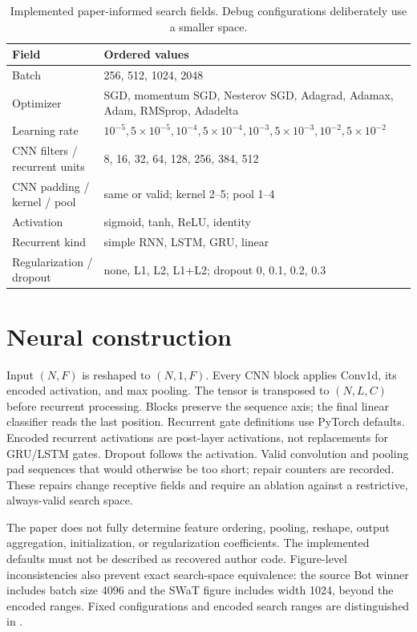 \documentclass[11pt,a4paper]{report}
\begin{document}
\begin{table}[htbp]\centering\small
\begin{tabular}{lp{10cm}}\toprule
Field & Ordered values\\\midrule
Batch & 256, 512, 1024, 2048\\
Optimizer & SGD, momentum SGD, Nesterov SGD, Adagrad, Adamax, Adam, RMSprop, Adadelta\\
Learning rate & $10^{-5},5\!\times\!10^{-5},10^{-4},5\!\times\!10^{-4},10^{-3},5\!\times\!10^{-3},10^{-2},5\!\times\!10^{-2}$\\
CNN filters / recurrent units & 8, 16, 32, 64, 128, 256, 384, 512\\
CNN padding / kernel / pool & same or valid; kernel 2--5; pool 1--4\\
Activation & sigmoid, tanh, ReLU, identity\\
Recurrent kind & simple RNN, LSTM, GRU, linear\\
Regularization / dropout & none, L1, L2, L1+L2; dropout 0, 0.1, 0.2, 0.3\\\bottomrule
\end{tabular}\caption{Implemented paper-informed search fields. Debug configurations deliberately use a smaller space.}\end{table}

\section{Neural construction}
Input $(N,F)$ is reshaped to $(N,1,F)$. Every CNN block applies Conv1d, its encoded activation, and max pooling. The tensor is transposed to $(N,L,C)$ before recurrent processing. Blocks preserve the sequence axis; the final linear classifier reads the last position. Recurrent gate definitions use PyTorch defaults. Encoded recurrent activations are post-layer activations, not replacements for GRU/LSTM gates. Dropout follows the activation. Valid convolution and pooling pad sequences that would otherwise be too short; repair counters are recorded. These repairs change receptive fields and require an ablation against a restrictive, always-valid search space.

The paper does not fully determine feature ordering, pooling, reshape, output aggregation, initialization, or regularization coefficients. The implemented defaults must not be described as recovered author code. Figure-level inconsistencies also prevent exact search-space equivalence: the source Bot winner includes batch size 4096 and the SWaT figure includes width 1024, beyond the encoded ranges. Fixed configurations and encoded search ranges are distinguished in .
\end{document}

